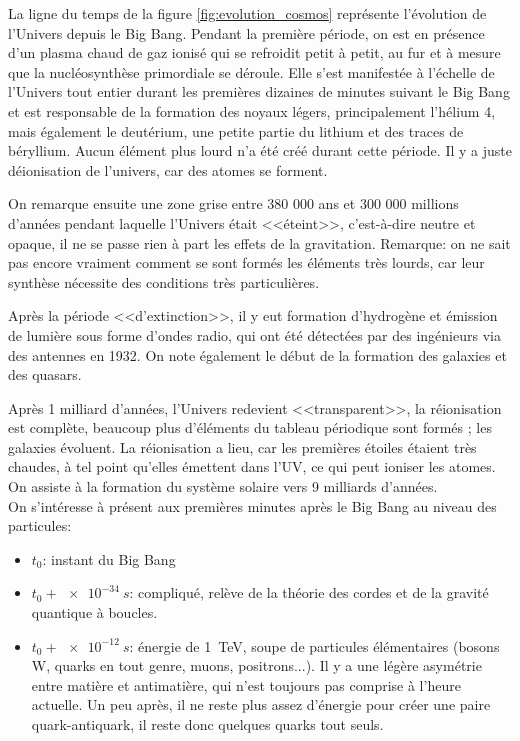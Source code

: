 La ligne du temps de la figure \ref{fig:evolution_cosmos} représente l'évolution de l'Univers depuis le Big Bang. Pendant la première période, on est en présence d'un plasma chaud de gaz ionisé qui se refroidit petit à petit, au fur et à mesure que la nucléosynthèse primordiale se déroule. Elle s'est manifestée à l'échelle de l'Univers tout entier durant les premières dizaines de minutes suivant le Big Bang et est responsable de la formation des noyaux légers, principalement l'hélium 4, mais également le deutérium, une petite partie du lithium et des traces de béryllium. Aucun élément plus lourd n'a été créé durant cette période. Il y a juste déionisation de l'univers, car des atomes se forment.

On remarque ensuite une zone grise entre 380 000 ans et 300 000 millions d'années pendant laquelle l'Univers était <<éteint>>, c'est-à-dire neutre et opaque, il ne se passe rien à part les effets de la gravitation. Remarque: on ne sait pas encore vraiment comment se sont formés les éléments très lourds, car leur synthèse nécessite des conditions très particulières.

Après la période <<d'extinction>>, il y eut formation d'hydrogène et émission de lumière sous forme d'ondes radio, qui ont été détectées par des ingénieurs via des antennes en 1932. On note également le début de la formation des galaxies et des quasars.

Après 1 milliard d'années, l'Univers redevient <<transparent>>, la réionisation est complète,  beaucoup plus d'éléments du tableau périodique sont formés ; les galaxies évoluent. La réionisation a lieu, car les premières étoiles étaient très chaudes, à tel point qu'elles émettent dans l'UV, ce qui peut ioniser les atomes. On assiste à la formation du système solaire vers 9 milliards d'années.\\

On s'intéresse à présent aux premières minutes après le Big Bang au niveau des particules:
\begin{itemize}
    \item $t_0$: instant du Big Bang
    \item $t_0 + \SI{e-34}{s}$: compliqué, relève de la théorie des cordes et de la gravité quantique à boucles.
    \item $t_0 + \SI{e-12}{s}$: énergie de \SI{1}{TeV}, soupe de particules élémentaires (bosons W, quarks en tout genre, muons, positrons...). Il y a une légère asymétrie entre matière et antimatière, qui n'est toujours pas comprise à l'heure actuelle. Un peu après, il ne reste plus assez d'énergie pour créer une paire quark-antiquark, il reste donc quelques quarks tout seuls.
\end{itemize}

